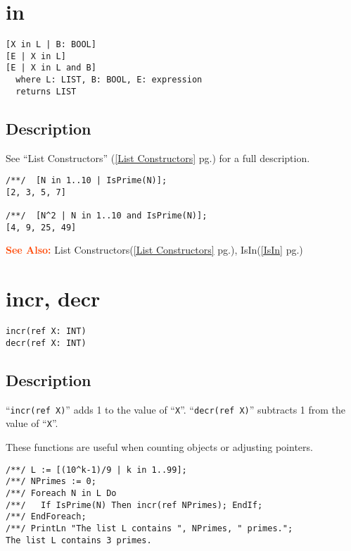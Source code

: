 \documentclass[a4paper]{mybook}
\newenvironment{command}{}{} %
\newcommand\SeeAlso{\par\textcolor{OrangeRed}{\textbf{\large See Also: }}}
\begin{document}
\section{in}
\label{in}
\begin{command} %


\begin{Verbatim}[label=syntax, rulecolor=\color{MidnightBlue},
frame=single]
[X in L | B: BOOL]
[E | X in L]
[E | X in L and B]
  where L: LIST, B: BOOL, E: expression
  returns LIST
\end{Verbatim}


\subsection*{Description}

See ``List Constructors'' (\ref{List Constructors} pg.\pageref{List Constructors}) for a full description.
\begin{Verbatim}[label=example, rulecolor=\color{PineGreen}, frame=single]
/**/  [N in 1..10 | IsPrime(N)];
[2, 3, 5, 7]

/**/  [N^2 | N in 1..10 and IsPrime(N)];
[4, 9, 25, 49]
\end{Verbatim}


\SeeAlso %
  List Constructors(\ref{List Constructors} pg.\pageref{List Constructors}), 
    IsIn(\ref{IsIn} pg.\pageref{IsIn})
\end{command} %

\section{incr, decr}
\label{incr, decr}
\begin{command} %


\begin{Verbatim}[label=syntax, rulecolor=\color{MidnightBlue},
frame=single]
incr(ref X: INT)
decr(ref X: INT)
\end{Verbatim}


\subsection*{Description}

``\verb&incr(ref X)&'' adds 1 to the value of ``\verb&X&''.
``\verb&decr(ref X)&'' subtracts 1 from the value of ``\verb&X&''.
\par 
These functions are useful when counting objects or adjusting pointers.
\begin{Verbatim}[label=example, rulecolor=\color{PineGreen}, frame=single]
/**/ L := [(10^k-1)/9 | k in 1..99];
/**/ NPrimes := 0;
/**/ Foreach N in L Do
/**/   If IsPrime(N) Then incr(ref NPrimes); EndIf;
/**/ EndForeach;
/**/ PrintLn "The list L contains ", NPrimes, " primes.";
The list L contains 3 primes.
\end{Verbatim}


\end{command} %
\end{document}

